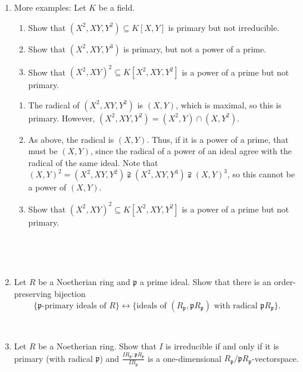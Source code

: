 \documentclass[12pt]{amsart}
\newcommand{\p}{\mathfrak{p}}
\renewcommand{\1}{\mathbbm{1}}
\newcommand{\solution}[1]{\ifthenelse {\equal{\displaysol}{1}} {\begin{framed}{\color{meretale}\noindent #1}\end{framed}} { \ }}
\newcommand\itemB{\stepcounter{enumi}\item[(\theenumi)]}
\begin{document}
\begin{enumerate}
\itemB More examples: Let $K$ be a field.
\begin{enumerate}
\item Show that $(X^2,XY,Y^2)\subseteq K[X,Y]$ is primary but not irreducible.
\item Show that $(X^2, XY, Y^3)$ is primary, but not a power of a prime.
\item Show that $(X^2,XY)^2 \subseteq  K[X^2,XY,Y^2]$ is a power of a prime but not primary.
\end{enumerate}

\solution{
\begin{enumerate}
\item The radical of $(X^2,XY,Y^2)$ is $(X,Y)$, which is maximal, so this is primary. However, $(X^2,XY,Y^2)=(X^2,Y)\cap (X,Y^2)$.
\item As above, the radical is $(X,Y)$. Thus, if it is a power of a prime, that must be $(X,Y)$, since the radical of a power of an ideal agree with the radical of the same ideal. Note that $(X,Y)^2 = (X^2,XY,Y^2) \supsetneqq (X^2, XY, Y^3) \supsetneqq (X,Y)^3$, so this cannot be a power of $(X,Y)$.
\item Show that $(X^2,XY)^2 \subseteq  K[X^2,XY,Y^2]$ is a power of a prime but not primary.
\end{enumerate}
}


\

\itemB Let $R$ be a Noetherian ring and $\p$ a prime ideal. Show that there is an order-preserving bijection
\[ \{ \text{$\p$-primary ideals of $R$} \} \leftrightarrow  \{ \text{ideals of $(R_\p, \p R_\p)$ with radical $\p R_\p$}\}.\]

\

\itemB Let $R$ be a Noetherian ring. Show that $I$ is irreducible if and only if it is primary (with radical $\p$) and $\displaystyle \frac{I R_\p : \p R_\p}{I R_\p}$ is a one-dimensional $R_\p/\p R_\p$-vectorspace. 


\end{enumerate}
\end{document}
